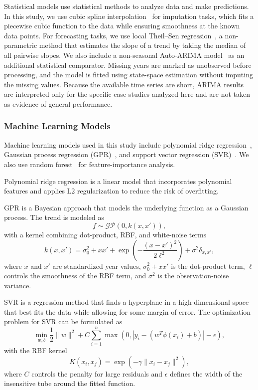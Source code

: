 Statistical models use statistical methods to analyze data and make predictions.
In this study, we use cubic spline interpolation~\cite{de1978practical} for imputation tasks, which fits a piecewise cubic function to the data while ensuring smoothness at the known data points.
For forecasting tasks, we use local Theil--Sen regression~\cite{sen1968estimates}, a non-parametric method that estimates the slope of a trend by taking the median of all pairwise slopes.
We also include a non-seasonal Auto-ARIMA model~\cite{box2015time} as an additional statistical comparator.
Missing years are marked as unobserved before processing, and the model is fitted using state-space estimation without imputing the missing values.
Because the available time series are short, ARIMA results are interpreted only for the specific case studies analyzed here and are not taken as evidence of general performance.

\subsubsection{Machine Learning Models}

Machine learning models used in this study include polynomial ridge regression~\cite{hoerl1970ridge}, Gaussian process regression (GPR)~\cite{seeger2004gaussian}, and support vector regression (SVR)~\cite{smola2004tutorial}. We also use random forest~\cite{breiman2001random} for feature-importance analysis.

Polynomial ridge regression is a linear model that incorporates polynomial features and applies L2 regularization to reduce the risk of overfitting.

GPR is a Bayesian approach that models the underlying function as a Gaussian process. The trend is modeled as
\begin{equation}
	f \sim \mathcal{GP}(0, k(x, x')),
\end{equation}
with a kernel combining dot-product, RBF, and white-noise terms
\begin{equation}
	k(x, x') = \sigma_0^2 + xx' + \exp \left( -\frac{(x - x')^2}{2 \ell^2} \right) + \sigma^2 \delta_{x, x'},
\end{equation}
where \(x\) and \(x'\) are standardized year values, \(\sigma_0^2 + xx'\) is the dot-product term, \(\ell\) controls the smoothness of the RBF term, and \(\sigma^2\) is the observation-noise variance.

SVR is a regression method that finds a hyperplane in a high-dimensional space that best fits the data while allowing for some margin of error. The optimization problem for SVR can be formulated as
\begin{equation}
	\min_{w, b} \frac{1}{2} \| w \|^2 + C \sum_{i=1}^n \max(0, |y_i - (w^T \phi(x_i) + b)| - \epsilon),
\end{equation}
with the RBF kernel
\begin{equation}
	K(x_i, x_j) = \exp \left( -\gamma \| x_i - x_j \|^2 \right),
\end{equation}
where \(C\) controls the penalty for large residuals and \(\epsilon\) defines the width of the insensitive tube around the fitted function.

